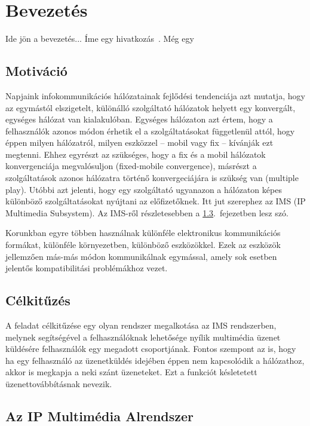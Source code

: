 
\section{Bevezetés}

Ide jön a bevezetés... Íme egy hivatkozás~\cite{KonyvId}. Még egy~\cite{sds_tech_desc}

\subsection{Motiváció}

Napjaink infokommunikációs hálózatainak fejlődési tendenciája azt mutatja, hogy az egymástól elszigetelt,
különálló szolgáltató hálózatok helyett egy konvergált, egységes hálózat van kialakulóban. Egységes hálózaton azt értem, hogy a felhasználók azonos módon érhetik el a szolgáltatásokat függetlenül attól, hogy éppen milyen hálózatról, milyen eszközzel -- mobil vagy fix -- kívánják ezt megtenni. Ehhez egyrészt az szükséges, hogy a fix és a mobil hálózatok konvergenciája megvalósuljon (fixed-mobile convergence), másrészt a szolgáltatások azonos hálózatra történő konvergeciájára is szükség van (multiple play). Utóbbi azt jelenti, hogy egy szolgáltató ugyanazon a hálózaton képes különböző szolgáltatásokat nyújtani az előfizetőknek. Itt jut szerephez az IMS (IP Multimedia Subsystem). Az IMS-ről részletesebben a \ref{sec:ims}.~fejezetben lesz szó.

Korunkban egyre többen használnak különféle elektronikus kommunikációs formákat, különféle környezetben, különböző eszközökkel. Ezek az eszközök jellemzően más-más módon kommunikálnak egymással, amely sok esetben jelentős kompatibilitási problémákhoz vezet.

\subsection{Célkitűzés}

A feladat célkitűzése egy olyan rendszer megalkotása az IMS rendszerben, melynek
segítségével a felhasználóknak lehetősége nyílik multimédia üzenet küldésére felhasználók egy megadott csoportjának. Fontos szempont az is, hogy ha egy felhasználó az üzenetküldés idejében éppen nem kapcsolódik a hálózathoz, akkor is megkapja a neki szánt üzeneteket. Ezt a funkciót késletetett üzenettovábbításnak nevezik.

\subsection{Az IP Multimédia Alrendszer}
\label{sec:ims}

